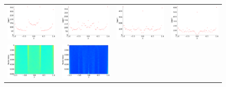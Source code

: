 \documentclass[senior,final,11pt]{iscs-thesis}
\begin{document}
\begin{figure}[htbp]
  \setlength\tabcolsep{0pt}
  \hspace{-3.0cm}
  \begin{tabular}{cccc}
    \includegraphics[width=45mm]{figure/circular_ladder_graph_n3000txt_dos.png} &
    \includegraphics[width=45mm]{figure/circular_ladder_graph_deleted_n3000_pdel01txt_dos.png} &
    \includegraphics[width=45mm]{figure/circular_ladder_graph_deleted_n3000_pdel02txt_dos.png} &
    \includegraphics[width=45mm]{figure/circular_ladder_graph_deleted_n3000_pdel03txt_dos.png} \\
    \includegraphics[width=45mm]{figure/circular_ladder_graph_n3000txt_pdos.png} &
    \includegraphics[width=45mm]{figure/circular_ladder_graph_deleted_n3000_pdel01txt_pdos.png} &

\end{tabular}
\end{figure}
\end{document}
